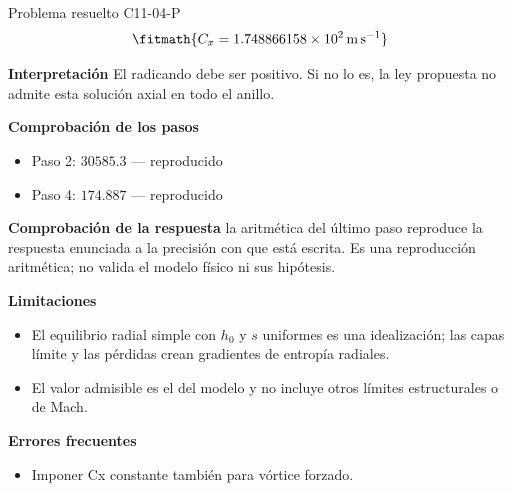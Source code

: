 \documentclass[10pt,openany]{book}
\begin{document}
\begin{studiumworked}{Problema resuelto C11-04-P}
\[
\fitmath{C_x=1.748866158\times10^{2}\,\mathrm{m}\,\mathrm{s}^{-1}}
\]

\noindent\textbf{Interpretación}
El radicando debe ser positivo. Si no lo es, la ley propuesta no admite esta solución axial en todo el anillo.

\noindent\textbf{Comprobación de los pasos}
\begin{itemize}
\item Paso 2: $30585.3$ — reproducido
\item Paso 4: $174.887$ — reproducido
\end{itemize}

\noindent\textbf{Comprobación de la respuesta} la aritmética del último paso reproduce la respuesta enunciada a la precisión con que está escrita. Es una reproducción aritmética; no valida el modelo físico ni sus hipótesis.

\noindent\textbf{Limitaciones}
\begin{itemize}
\item El equilibrio radial simple con $h_0$ y $s$ uniformes es una idealización; las capas límite y las pérdidas crean gradientes de entropía radiales.
\item El valor admisible es el del modelo y no incluye otros límites estructurales o de Mach.
\end{itemize}

\noindent\textbf{Errores frecuentes}
\begin{itemize}
\item Imponer Cx constante también para vórtice forzado.
\end{itemize}
\end{studiumworked}
\end{document}
